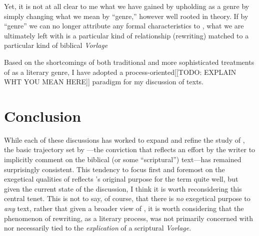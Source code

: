  Yet, it is not at all clear to me what we have gained by upholding \rwb as a genre by simply changing what we mean by ``genre,'' however well rooted in theory.\autocite[Machiela critiques Zahn's approach for similar reasons. See][]{machiela_jjs2010} If by ``genre'' we can no longer attribute any formal characteristics to \rwb, what we are ultimately left with is a particular kind of relationship (rewriting) matched to a particular kind of biblical \emph{Vorlage} 

 Based on the shortcomings of both traditional and more sophisticated treatments of \rwb as a literary genre, I have adopted a process-oriented[[TODO: EXPLAIN WHT YOU MEAN HERE]] paradigm for my discussion of \rwb texts.\autocite[I am in broad agreement with Campbell's treatment of the matter. See][64--67]{campbell_zsengeller2014} 

 \hypertarget{conclusion}{%
\section{Conclusion}\label{conclusion}} 

 While each of these discussions has worked to expand and refine the study of \rwb, the basic trajectory set by \vermes---the conviction that \rwb reflects an effort by the writer to implicitly comment on the biblical (or some ``scriptural'') text---has remained surprisingly consistent. This tendency to focus first and foremost on the exegetical qualities of \rwb reflects \vermes's original purpose for the term quite well, but given the current state of the discussion, I think it is worth reconsidering this central tenet. This is not to say, of course, that there is \emph{no} exegetical purpose to \emph{any} \rwb text, rather that given a broader view of \rwb, it is worth considering that the phenomenon of rewriting, as a literary process, was not primarily concerned with nor necessarily tied to the \emph{explication} of a scriptural \emph{Vorlage}. 

